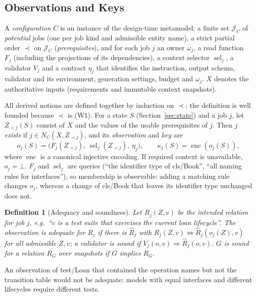 \documentclass[pdflatex,sn-mathphys-num]{sn-jnl}
\theoremstyle{thmstyleone}%
\theoremstyle{thmstyletwo}%
\theoremstyle{thmstylethree}%
\newtheorem{definition}{Definition}%
\newcommand{\Jobs}{\mathcal J}
\newcommand{\key}{\kappa}
\newcommand{\enc}{\operatorname{enc}}
\newcommand{\nodata}{\bot}
\newcommand{\vw}[1]{\textsf{#1}}
\begin{document}
\subsection{Observations and Keys}\label{sec:obs}
A \emph{configuration} $C$ is an instance of the design-time metamodel: a finite set $\Jobs_C$ of \emph{potential} jobs (one per job kind and admissible entity name), a strict partial order $\prec$ on $\Jobs_C$ (\emph{prerequisites}), and for each job $j$ an owner $\omega_j$, a read function $F_j$ (including the projections of its dependencies), a context selector $\operatorname{sel}_j$, a validator $V_j$ and a contract $\eta_j$ that identifies the instruction, output schema, validator and its environment, generation settings, budget and $\omega_j$. $X$ denotes the authoritative inputs (requirements and immutable context snapshots).

All derived notions are defined together by induction on $\prec$; the definition is well founded because $\prec$ is (W1). For a state $S$ (Section~\ref{sec:state}) and a job $j$, let $Z_{\prec j}(S)$ consist of $X$ and the values of the usable prerequisites of $j$. Then $j$ \emph{exists} if $j\in N_C(X,Z_{\prec j})$, and its \emph{observation} and \emph{key} are
\begin{equation}\label{eq:obs}
o_j(S)=\bigl(F_j(Z_{\prec j}),\ \operatorname{sel}_j(Z_{\prec j}),\ \eta_j\bigr),\qquad \key_j(S)=\enc(o_j(S)),
\end{equation}
where $\enc$ is a canonical injective encoding. If required context is unavailable, $o_j=\nodata$. $F_j$ and $\operatorname{sel}_j$ are queries (``the identifier type of \vw{cls/Book}'', ``all naming rules for interfaces''), so membership is observable: adding a matching rule changes $o_j$, whereas a change of \vw{cls/Book} that leaves its identifier type unchanged does not.

\begin{definition}[Adequacy and soundness]\label{def:adequate}
Let $R_j(Z,v)$ be the intended relation for job $j$, e.g.\ ``$v$ is a test suite that exercises the current loan lifecycle''. The observation is \emph{adequate} for $R_j$ if there is $\widehat R_j$ with $R_j(Z,v)\iff\widehat R_j(o_j(Z),v)$ for all admissible $Z,v$; a validator is \emph{sound} if $V_j(o,v)\Rightarrow\widehat R_j(o,v)$. $G$ is sound for a relation $R_G$ over snapshots if $G$ implies $R_G$.
\end{definition}
An observation of \vw{test/Loan} that contained the operation names but not the transition table would not be adequate: models with equal interfaces and different lifecycles require different tests.
\end{document}
